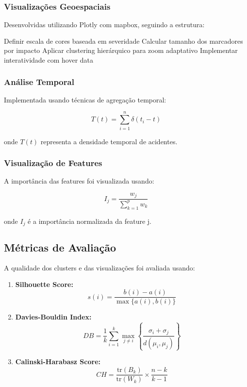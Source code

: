 \documentclass[conference]{IEEEtran}
\begin{document}
\subsubsection{Visualizações Geoespaciais}
Desenvolvidas utilizando Plotly com mapbox, seguindo a estrutura:

\begin{algorithmic}
\STATE Definir escala de cores baseada em severidade
\STATE Calcular tamanho dos marcadores por impacto
\STATE Aplicar clustering hierárquico para zoom adaptativo
\STATE Implementar interatividade com hover data
\end{algorithmic}

\subsubsection{Análise Temporal}
Implementada usando técnicas de agregação temporal:

\begin{equation}
T(t) = \sum_{i=1}^n \delta(t_i - t)
\end{equation}

onde $T(t)$ representa a densidade temporal de acidentes.

\subsubsection{Visualização de Features}
A importância das features foi visualizada usando:

\begin{equation}
I_j = \frac{w_j}{\sum_{k=1}^p w_k}
\end{equation}

onde $I_j$ é a importância normalizada da feature j.

\subsection{Métricas de Avaliação}
A qualidade dos clusters e das visualizações foi avaliada usando:

\begin{enumerate}
\item \textbf{Silhouette Score:}
\begin{equation}
s(i) = \frac{b(i) - a(i)}{\max\{a(i), b(i)\}}
\end{equation}

\item \textbf{Davies-Bouldin Index:}
\begin{equation}
DB = \frac{1}{k} \sum_{i=1}^k \max_{j \neq i} \left\{\frac{\sigma_i + \sigma_j}{d(\mu_i, \mu_j)}\right\}
\end{equation}

\item \textbf{Calinski-Harabasz Score:}
\begin{equation}
CH = \frac{\text{tr}(B_k)}{\text{tr}(W_k)} \times \frac{n-k}{k-1}
\end{equation}
\end{enumerate}
\end{document}
